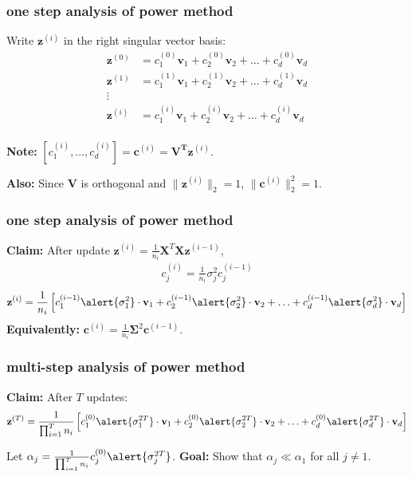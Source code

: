 \documentclass[compress]{beamer}
\newcommand{\bs}[1]{\boldsymbol{#1}}
\newcommand{\bv}[1]{\mathbf{#1}}
\begin{document}
\begin{frame}[t]
	\frametitle{one step analysis of power method}
	Write $\bv{z}^{(i)}$ in the right singular vector basis:
	\begin{align*}
		\bv{z}^{(0)} &= c_1^{(0)}\bv{v}_1 + {c}_2^{(0)}\bv{v}_2 + \ldots + c_d^{(0)} \bv{v}_d \\
		\bv{z}^{(1)} &= c_1^{(1)}\bv{v}_1 + {c}_2^{(1)}\bv{v}_2 + \ldots + c_d^{(1)} \bv{v}_d\\
		\vdots&\\
		\bv{z}^{(i)} &= c_1^{(i)}\bv{v}_1 + {c}_2^{(i)}\bv{v}_2 + \ldots + c_d^{(i)} \bv{v}_d\\
	\end{align*}
	
	\textbf{Note:} $[c_1^{(i)}, \ldots, c_d^{(i)}] = \bv{c}^{(i)} = \bv{V^T}\bv{z}^{(i)}$.
	
	\textbf{Also:} Since $\bv{V}$ is orthogonal and $\|\bv{z}^{(i)}\|_2 = 1$, $\|\bv{c}^{(i)}\|_2^2 = 1$. 
\end{frame}

\begin{frame}[t]
	\frametitle{one step analysis of power method}
	\textbf{Claim:} After update $\bv{z}^{(i)} =  \frac{1}{n_i}\bv{X}^T\bv{X}\bv{z}^{(i-1)}$,
	\begin{align*}
		c_j^{(i)} =  \frac{1}{n_i}\sigma_j^2 c_j^{(i-1)}
	\end{align*}
\vspace{-.5em}
	\begin{align*}
		\bv{z}^{(i)} = \frac{1}{n_i}\left[ c_1^{(i-1)}\alert{\sigma_1^2}\cdot\bv{v}_1 + {c}_2^{(i-1)} \alert{\sigma_2^2}\cdot\bv{v}_2 + \ldots + c_d^{(i-1)} \alert{\sigma_d^2} \cdot\bv{v}_d\right]
	\end{align*}
\textbf{Equivalently:} $\bv{c}^{(i)}= \frac{1}{n_i}\bs{\Sigma}^2\bv{c}^{(i-1)}.$
\end{frame}

\begin{frame}[t]
	\frametitle{multi-step analysis of power method}
	\textbf{Claim:} After $T$ updates:
	\begin{align*}
	\bv{z}^{(T)} = \frac{1}{\prod_{i=1}^T n_i} \left[ c_1^{(0)}\alert{\sigma_1^{2T}}\cdot \bv{v}_1 + c_2^{(0)} \alert{\sigma_2^{2T}}\cdot \bv{v}_2 + \ldots + c_d^{(0)} \alert{\sigma_d^{2T}}\cdot \bv{v}_d \right]
	\end{align*}


\vspace{10em}

Let $\alpha_j = \frac{1}{\prod_{i=1}^T n_i}c_j^{(0)}\alert{\sigma_j^{2T}}$. 
\textbf{Goal:} Show that $\alpha_j \ll \alpha_1$ for all $j\neq 1$. 
\end{frame}
\end{document}
